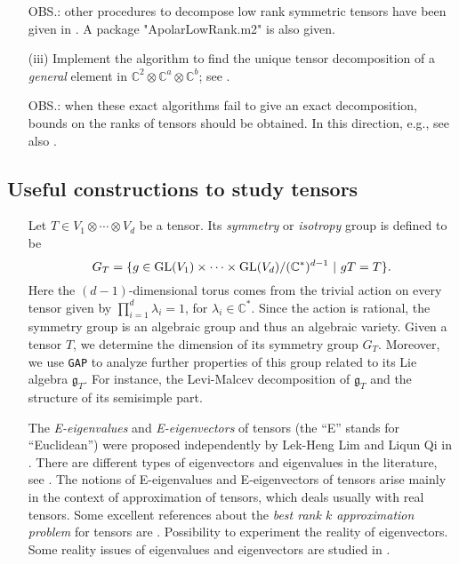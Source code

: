 \documentclass[11pt]{extarticle}
\theoremstyle{definition}
\theoremstyle{remark}
\theoremstyle{definition}
\newcommand{\CC}{\mathbb{C}}
\begin{document}
\begin{itemize}
OBS.: other procedures to decompose low rank symmetric tensors have been given in \cite{MoOn18}. A package "ApolarLowRank.m2" is also given.

\item[(iii)] Implement the algorithm to find the unique tensor decomposition of a {\it general} element in $\CC^2 \otimes \CC^a \otimes \CC^b$; see \cite[Section 12.4.3]{Lan12}.
	
	OBS.: when these exact algorithms fail to give an exact decomposition, bounds on the ranks of tensors should be obtained. In this direction, e.g., see also \cite[Theorem 3.8.2.4]{Lan12}.
\end{itemize}

\subsection*{Useful constructions to study tensors}


\begin{itemize}
\item[]Let $T\in V_1\otimes \cdots \otimes V_d$ be a tensor. Its  {\it symmetry} or {\it isotropy} group is defined to be 
$$
G_T = \lbrace g\in \textnormal{GL}(V_1)\times \cdots \times \textnormal{GL}(V_d)/(\mathbb C^{*})^{d-1} \ | \ gT = T \rbrace.  
$$
\noindent Here the $(d-1)$-dimensional torus comes from the trivial action on every tensor given by $\prod_{i=1}^d \lambda_i = 1$, for $\lambda_i\in \mathbb C^{*}$. Since the action is rational, the symmetry group is an algebraic group and thus an algebraic variety. Given a tensor $T$, we determine the dimension of its symmetry group $G_T$. Moreover, we use \texttt{GAP} to analyze further properties of this group related to its Lie algebra $\mathfrak g_T$. For instance, the Levi-Malcev decomposition of $\mathfrak g_T$ and the structure of its semisimple part. 
\end{itemize}

\bigskip
{}

\begin{itemize}
\item[] The \emph{E-eigenvalues} and \emph{E-eigenvectors} of tensors (the ``E'' stands for ``Euclidean'') were proposed independently by Lek-Heng Lim and Liqun Qi in \cite{lim2005singular,qi2005eigenvalues}. There are different types of eigenvectors and eigenvalues in the literature, see \cite{cartwright2013number,hu2013determinants,ni2007degree,qi2007eigenvalues,qi2017tensor}. The notions of E-eigenvalues and E-eigenvectors of tensors arise mainly in the context of approximation of tensors, which deals usually with real tensors. Some excellent references about the \emph{best rank $k$ approximation problem} for tensors are \cite{draisma2017best,friedland2014number}. Possibility to experiment the reality of eigenvectors. Some reality issues of eigenvalues and eigenvectors are studied in \cite{maccioni1972number,kozhasov2017fully}.
\end{itemize}
\end{document}
